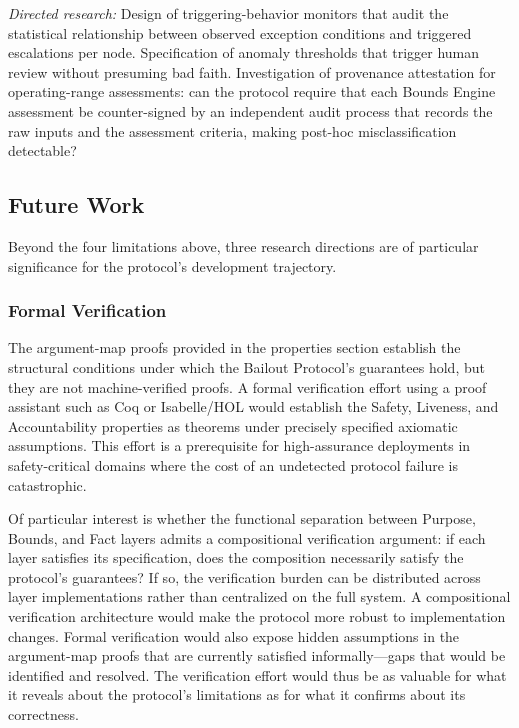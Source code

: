 \textit{Directed research:} Design of triggering-behavior monitors that audit the statistical relationship between observed exception conditions and triggered escalations per node. Specification of anomaly thresholds that trigger human review without presuming bad faith. Investigation of provenance attestation for operating-range assessments: can the protocol require that each Bounds Engine assessment be counter-signed by an independent audit process that records the raw inputs and the assessment criteria, making post-hoc misclassification detectable?

\subsection{Future Work}

Beyond the four limitations above, three research directions are of particular significance for the protocol's development trajectory.

\subsubsection{Formal Verification}

The argument-map proofs provided in the properties section establish the structural conditions under which the Bailout Protocol's guarantees hold, but they are not machine-verified proofs. A formal verification effort using a proof assistant such as Coq or Isabelle/HOL would establish the Safety, Liveness, and Accountability properties as theorems under precisely specified axiomatic assumptions. This effort is a prerequisite for high-assurance deployments in safety-critical domains where the cost of an undetected protocol failure is catastrophic.

Of particular interest is whether the functional separation between Purpose, Bounds, and Fact layers admits a compositional verification argument: if each layer satisfies its specification, does the composition necessarily satisfy the protocol's guarantees? If so, the verification burden can be distributed across layer implementations rather than centralized on the full system. A compositional verification architecture would make the protocol more robust to implementation changes. Formal verification would also expose hidden assumptions in the argument-map proofs that are currently satisfied informally---gaps that would be identified and resolved. The verification effort would thus be as valuable for what it reveals about the protocol's limitations as for what it confirms about its correctness.

